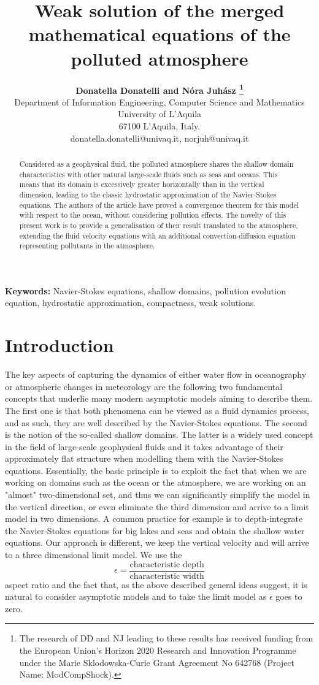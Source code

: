 \documentclass[11pt]{article}
\title{Weak solution of the merged mathematical equations of the polluted atmosphere}
\author{
\large{\bf{Donatella Donatelli} and \bf{N\'ora Juh\'asz}
\thanks{The research of DD and NJ leading to these results has received funding from the European Union's Horizon 2020 Research and Innovation Programme under the Marie Sklodowska-Curie Grant Agreement No 642768 (Project Name: ModCompShock).}} \\[1ex]
\normalsize Department of Information Engineering, Computer Science and Mathematics \\
\normalsize University of L'Aquila \\
\normalsize 67100 L'Aquila, Italy. \\
\normalsize {donatella.donatelli@univaq.it}, {norjuh@univaq.it}
}
\date{}
\begin{document}
\maketitle

\begin{abstract}

Considered as a geophysical fluid, the polluted atmosphere shares the shallow domain characteristics with other natural large-scale fluids such as seas and oceans. This means that its domain is excessively greater horizontally than in the vertical dimension, leading to the classic hydrostatic approximation of the Navier-Stokes equations. The authors of the \cite{azerad2001mathematical} article have proved a convergence theorem for this model with respect to the ocean, without considering pollution effects. The novelty of this present work is to provide a generalisation of their result translated to the atmosphere, extending the fluid velocity equations with an additional convection-diffusion equation representing pollutants in the atmosphere. 

\end{abstract}

{\bf Keywords:} Navier-Stokes equations, shallow domains, pollution evolution equation, hydrostatic approximation, compactness, weak solutions.

\newpage

\tableofcontents
\newpage

\section{Introduction} \label{Introduction}

The key aspects of capturing the dynamics of either water flow in oceanography or atmospheric changes in meteorology are the following two fundamental concepts that underlie many modern asymptotic models aiming to describe them. The first one is that both phenomena can be viewed as a fluid dynamics process, and as such, they are well described by the Navier-Stokes equations. The second is the notion of the so-called shallow domains. The latter is a widely used concept in the field of large-scale geophysical fluids and it takes advantage of their approximately flat structure when modelling them with the Navier-Stokes equations. Essentially, the basic principle is to exploit the fact that when we are working on domains such as the ocean or the atmosphere, we are working on an "almost" two-dimensional set, and thus we can significantly simplify the model in the vertical direction, or even eliminate the third dimension and arrive to a limit model in two dimensions.
A common practice for example is to depth-integrate the Navier-Stokes equations for big lakes and seas and obtain the shallow water equations.
Our approach is different, we keep the vertical velocity and will arrive to a three dimensional limit model.
We use the
%
\[ \epsilon = \frac{\text{characteristic depth}}{\text{characteristic width}} \]
%
aspect ratio and the fact that, as the above described general ideas suggest, it is natural to consider asymptotic models and to take the limit model as $\epsilon$ goes to zero.
\end{document}

